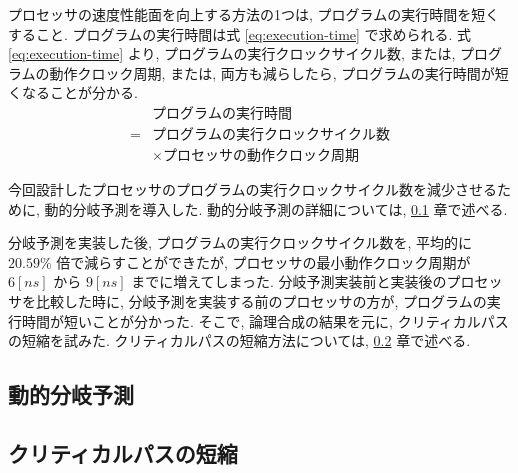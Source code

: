 \documentclass[../main.tex]{subfiles}
\begin{document}
  プロセッサの速度性能面を向上する方法の1つは, プログラムの実行時間を短くすること.
  プログラムの実行時間は式 \ref{eq:execution-time} で求められる.
  式 \ref{eq:execution-time} より, プログラムの実行クロックサイクル数, 
  または, プログラムの動作クロック周期, 
  または, 両方も減らしたら, プログラムの実行時間が短くなることが分かる.
  \begin{equation}
    \begin{aligned}
      &プログラムの実行時間 \\
      = &プログラムの実行クロックサイクル数 \\
      &\times プロセッサの動作クロック周期
      \label{eq:execution-time}
    \end{aligned}
  \end{equation}

  今回設計したプロセッサのプログラムの実行クロックサイクル数を減少させるために, 動的分岐予測を導入した.
  動的分岐予測の詳細については, \ref{subsection:jump-prediction} 章で述べる.

  分岐予測を実装した後, プログラムの実行クロックサイクル数を, 
  平均的に $20.59\%$ 倍で減らすことができたが, 
  プロセッサの最小動作クロック周期が $6[ns]$ から $9[ns]$ までに増えてしまった.
  分岐予測実装前と実装後のプロセッサを比較した時に, 
  分岐予測を実装する前のプロセッサの方が, 
  プログラムの実行時間が短いことが分かった.
  そこで, 論理合成の結果を元に, クリティカルパスの短縮を試みた.
  クリティカルパスの短縮方法については, \ref{subsection:critical-path} 章で述べる.

  \subsection{動的分岐予測} \label{subsection:jump-prediction}
  

  \subsection{クリティカルパスの短縮} \label{subsection:critical-path}
  
\end{document}
